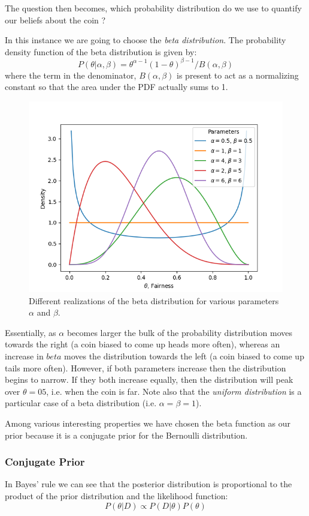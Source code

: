 The question then becomes, which probability distribution do we use to quantify our beliefs about the coin ?

In this instance we are going to choose the \emph{beta distribution}. The probability density function of the beta distribution is given by:
\begin{equation}
	P(\theta|\alpha,\beta)=\theta^{\alpha -1}(1-\theta)^{\beta-1}/B(\alpha,\beta)
\end{equation}
where the term in the denominator, $B(\alpha,\beta)$ is present to act as a normalizing constant so that the area under the PDF actually sums to 1.

\begin{figure}[htb]
  \centering
  \includegraphics[width=.7\textwidth]{figures/beta_distro}
  \caption{Different realizations of the beta distribution for various parameters $\alpha$ and $\beta$.}
  \label{fig:beta_distro}
\end{figure}

Essentially, as $\alpha$ becomes larger the bulk of the probability distribution moves towards the right (a coin biased to come up heads more often), whereas an increase in $beta$ moves the distribution towards the left (a coin biased to come up tails more often).
However, if both parameters increase then the distribution begins to narrow. If they both increase equally, then the distribution will peak over $\theta=05$, i.e. when the coin is far. Note also that the \emph{uniform distribution} is a particular case of a beta distribution (i.e. $\alpha = \beta = 1$).

Among various interesting properties we have chosen the beta function as our prior because it is a conjugate prior for the Bernoulli distribution.

\subsubsection{Conjugate Prior}
In Bayes' rule we can see that the posterior distribution is proportional to the product of the prior distribution and the likelihood function:
\begin{equation}
  P(\theta|D)\propto P(D|\theta)P(\theta)
\end{equation}

